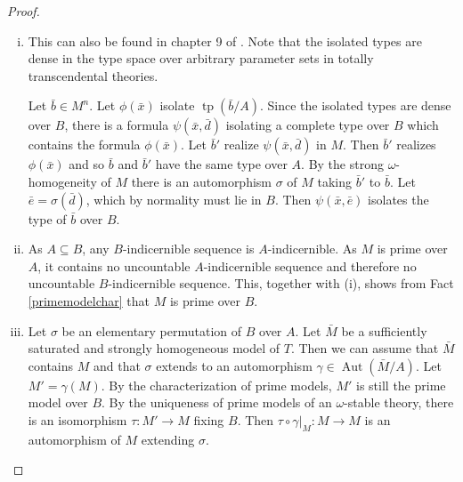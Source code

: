 \documentclass{article}
\theoremstyle{problemstyle}
\newtheorem{remark}[problem]{Remark}
\DeclareMathOperator{\tp}{tp} %
\DeclareMathOperator{\aut}{Aut} %
\newcommand{\xx}{\bar{x}}
\newcommand{\bb}{\bar{b}}
\newcommand{\dd}{\bar{d}}
\newcommand{\ee}{\bar{e}}
\begin{document}
\begin{proof}
    \begin{enumerate}[(i)]
        \item This can also be found in chapter 9 of \cite{tent_ziegler_2012}.  Note that the isolated types are dense in the type space over arbitrary parameter sets in totally transcendental theories. 
        
        Let $\bb \in M^n$. Let $\phi(\xx)$ isolate $\tp(\bb/A)$. Since the isolated types are dense over $B$, there is a formula $\psi(\xx,\dd)$ isolating a complete type over $B$ which contains the formula $\phi(\xx)$.  Let $\bb'$ realize $\psi(\xx,\dd)$ in $M$. Then $\bb'$ realizes $\phi(\xx)$ and so $\bb$ and $\bb'$ have the same type over $A$. By the strong $\omega$-homogeneity of $M$ there is an automorphism $\sigma$ of $M$ taking $\bb'$ to $\bb$. Let $\ee = \sigma(\dd)$, which by normality must lie in $B$. Then $\psi(\xx,\ee)$ isolates the type of $\bb$ over $B$.
        \item As $A \subseteq B$, any $B$-indicernible sequence is $A$-indicernible. As $M$ is prime over $A$, it contains no uncountable $A$-indicernible sequence and therefore no uncountable $B$-indicernible sequence. This, together with (i), shows from Fact \ref{primemodelchar} that $M$ is prime over $B$. 
        \item Let $\sigma$ be an elementary permutation of $B$ over $A$. Let $\bar{M}$ be a sufficiently saturated and strongly homogeneous model of $T$. Then we can assume that $\bar{M}$ contains $M$ and that $\sigma$ extends to an automorphism $\gamma\in \aut(\bar{M}/A)$. Let $M' = \gamma(M)$. By the characterization of prime models, $M'$ is still the prime model over $B$. By the uniqueness of prime models of an $\omega$-stable theory, there is an isomorphism $\tau:M' \to M$ fixing $B$. Then $\tau \circ \gamma|_M:M \to M$ is an automorphism of $M$ extending $\sigma$.
    \end{enumerate}
\end{proof}

    
\end{document}
